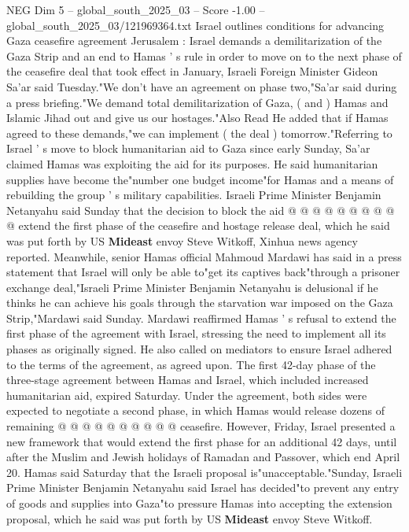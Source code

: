 \begin{textsample}{NEG Dim 5 – global\_south\_2025\_03 – Score -1.00 – global\_south\_2025\_03/121969364.txt}  \label{ex:f5_neg_272}
Israel outlines conditions for advancing Gaza ceasefire agreement Jerusalem : Israel demands a demilitarization of the Gaza Strip and an end to Hamas ' s rule in order to move on to the next phase of the ceasefire deal that took effect in January, Israeli Foreign Minister Gideon Sa'ar said Tuesday."We don't have an agreement on phase two,"Sa'ar said during a press briefing."We demand total demilitarization of Gaza, ( and ) Hamas and Islamic Jihad out and give us our hostages."Also Read He added that if Hamas agreed to these demands,"we can implement ( the deal ) tomorrow."Referring to Israel ' s move to block humanitarian aid to Gaza since early Sunday, Sa'ar claimed Hamas was exploiting the aid for its purposes.
He said humanitarian supplies have become the"number one budget income"for Hamas and a means of rebuilding the group ' s military capabilities.
Israeli Prime Minister Benjamin Netanyahu said Sunday that the decision to block the aid @ @ @ @ @ @ @ @ @ @ extend the first phase of the ceasefire and hostage release deal, which he said was put forth by US \textbf{Mideast} envoy Steve Witkoff, Xinhua news agency reported.
Meanwhile, senior Hamas official Mahmoud Mardawi has said in a press statement that Israel will only be able to"get its captives back"through a prisoner exchange deal,"Israeli Prime Minister Benjamin Netanyahu is delusional if he thinks he can achieve his goals through the starvation war imposed on the Gaza Strip,"Mardawi said Sunday.
Mardawi reaffirmed Hamas ' s refusal to extend the first phase of the agreement with Israel, stressing the need to implement all its phases as originally signed.
He also called on mediators to ensure Israel adhered to the terms of the agreement, as agreed upon.
The first 42-day phase of the three-stage agreement between Hamas and Israel, which included increased humanitarian aid, expired Saturday.
Under the agreement, both sides were expected to negotiate a second phase, in which Hamas would release dozens of remaining @ @ @ @ @ @ @ @ @ @ ceasefire.
However, Friday, Israel presented a new framework that would extend the first phase for an additional 42 days, until after the Muslim and Jewish holidays of Ramadan and Passover, which end April 20.
Hamas said Saturday that the Israeli proposal is"unacceptable."Sunday, Israeli Prime Minister Benjamin Netanyahu said Israel has decided"to prevent any entry of goods and supplies into Gaza"to pressure Hamas into accepting the extension proposal, which he said was put forth by US \textbf{Mideast} envoy Steve Witkoff.

\end{textsample}
